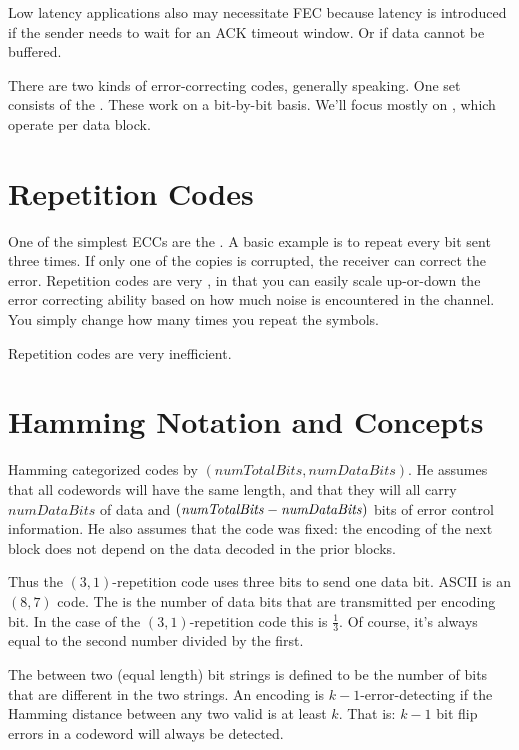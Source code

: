 \documentclass[11pt, oneside]{amsart}
\begin{document}
Low latency applications also may necessitate FEC because latency is
introduced if the sender needs to wait for an ACK timeout window. Or if
data cannot be buffered.

There are two kinds of error-correcting codes, generally speaking. One
set consists of the . These work on a
bit-by-bit basis. We'll focus mostly on , which
operate per data block.

\section{Repetition Codes}

One of the simplest ECCs are the . A basic
example is to repeat every bit sent three times. If only one of the
copies is corrupted, the receiver can correct the error. Repetition
codes are very , in that you can easily scale
up-or-down the error correcting ability based on how much noise is
encountered in the channel. You simply change how many times you repeat
the symbols.

Repetition codes are very inefficient.


\section{Hamming Notation and Concepts}

Hamming categorized codes by $(\mathit{numTotalBits},
\mathit{numDataBits})$. He assumes that all codewords will have the same
length, and that they will all carry $\mathit{numDataBits}$ of data and
$\mathopen{}\left( {\mathit{numTotalBits} - \mathit{numDataBits}} \right)\mathclose{}$ bits of error
control information. He also assumes that the code was fixed: the
encoding of the next block does not depend on the data decoded in the
prior blocks.

Thus the $(3, 1)$-repetition code uses three bits to send one data bit.
ASCII is an $(8, 7)$ code. The  is the number of data
bits that are transmitted per encoding bit. In the case of the $(3,
1)$-repetition code this is $\frac{1}{3}$. Of course, it's always equal
to the second number divided by the first.

The  between two (equal length) bit strings is
defined to be the number of bits that are different in the two strings.
An encoding is $k-1$-error-detecting if the Hamming distance between any
two valid  is at least $k$. That is: $k-1$ bit flip
errors in a codeword will always be detected.
\end{document}
